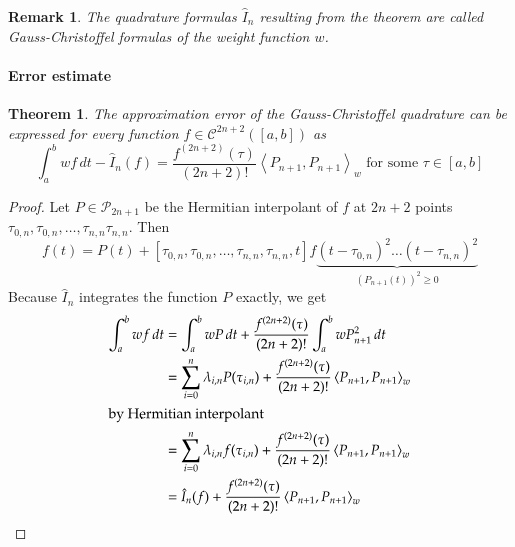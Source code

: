 \documentclass[a4paper]{article}
\newcounter{lecref}[section]
\numberwithin{lecref}{section}
\theoremstyle{break}
\newtheorem{thm}[lecref]{Theorem}
\newtheorem*{Remark}{Remark}
\newcommand{\IP}[2]{\left\langle#1, #2\right\rangle}
\begin{document}
\begin{Remark}
  The quadrature formulas $\hat{I}_n$ resulting from the theorem are called Gauss-Christoffel formulas of the weight function $w$.
\end{Remark}

\paragraph{Error estimate}
\begin{thm}
  \label{theorem:5-14}
  The approximation error of the Gauss-Christoffel quadrature can be expressed for every function $f \in \mathcal C^{2n+2}([a,b])$ as
  \[ \int_a^b w f \, dt - \hat{I}_n(f) = \frac{f^{(2n+2)}(\tau)}{(2n+2)!} \IP{P_{n+1}}{P_{n+1}}_w \text{ for some } \tau \in [a,b] \]
\end{thm}

\begin{proof}
  Let $P \in \mathcal P_{2n+1}$ be the Hermitian interpolant of $f$ at $2n+2$ points $\tau_{0,n}, \tau_{0,n}, \dots, \tau_{n,n} \tau_{n,n}$. Then
  \[ f(t) = P(t) + [\tau_{0,n}, \tau_{0,n}, \dots, \tau_{n,n}, \tau_{n,n}, t] f \underbrace{(t - \tau_{0,n})^2 \dots (t - \tau_{n,n})^2}_{(P_{n+1}(t))^2 \geq 0} \]
  Because $\hat{I}_n$ integrates the function $P$ exactly, we get
  \begin{align*}
    \int_a^b w f \, dt
      &= \int_a^b w P \, dt + \frac{f^{(2n+2)}(\tau)}{(2n+2)!} \int_a^b w P_{n+1}^2 \, dt \\
      &= \sum_{i=0}^n \lambda_{i,n} P(\tau_{i,n}) + \frac{f^{(2n+2)}(\tau)}{(2n+2)!} \IP{P_{n+1}}{P_{n+1}}_w \\
    \intertext{by Hermitian interpolant}
      &= \sum_{i=0}^n \lambda_{i,n} f(\tau_{i,n}) + \frac{f^{(2n+2)}(\tau)}{(2n+2)!} \IP{P_{n+1}}{P_{n+1}}_w \\
      &= \hat{I}_n(f) + \frac{f^{(2n+2)}(\tau)}{(2n+2)!} \IP{P_{n+1}}{P_{n+1}}_w
  \end{align*}
\end{proof}
\end{document}
